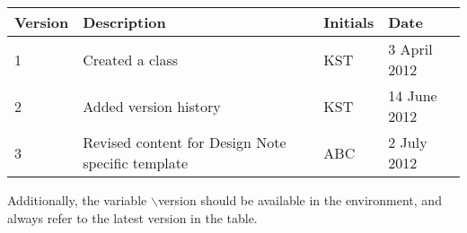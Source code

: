 \documentclass{mxl-design}
\begin{document}
\begin{tabular}{|l|l|l|l|}
	\hline
	Version & Description & Initials & Date \\ \hline
	1 & Created a class & KST & 3 April 2012 \\ \hline
	2 & Added version history & KST & 14 June 2012 \\ \hline
	3 & Revised content for Design Note specific template & ABC & 2 July 2012 \\ \hline
\end{tabular}

Additionally, the variable $\backslash$version should be available in the environment,
and always refer to the latest version in the table.

\end{document}
